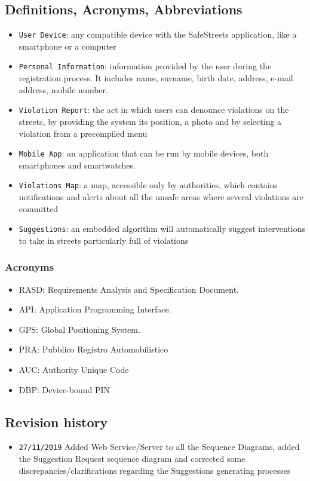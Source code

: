 \documentclass[12pt,a4paper]{article}
\begin{document}
\subsection{Definitions, Acronyms, Abbreviations}
			\begin{itemize}
				\item \texttt{User Device}: any compatible device with the SafeStreets application, like a smartphone or a computer
				\item \texttt{Personal Information}: information provided by the user during the registration process. It includes name, surname, birth date, address, e-mail address, mobile number.
				\item \texttt{Violation Report}: the act in which users can denounce violations on the streets, by providing the system its position, a photo and by selecting a violation from a precompiled menu
				\item \texttt{Mobile App}: an application that can be run by mobile devices, both smartphones and smartwatches.
				\item \texttt{Violations Map}: a map, accessible only by authorities, which contains notifications and alerts about all the unsafe areas where several violations are committed
				\item \texttt{Suggestions}: an embedded algorithm will automatically suggest interventions to take in streets particularly full of violations
			\end{itemize}
		\subsubsection{Acronyms}
			\begin{itemize}
				\item RASD: Requirements Analysis and Specification Document.
				\item API: Application Programming Interface.
				\item GPS: Global Positioning System.
				\item PRA: Pubblico Registro Automobilistico
				\item AUC: Authority Unique Code
				\item DBP: Device-bound PIN
			\end{itemize}
\subsection{Revision history}
\begin{itemize}
\item \texttt{27/11/2019} Added Web Service/Server to all the Sequence Diagrams, added the Suggestion Request sequence diagram and corrected some discrepancies/clarifications regarding the Suggestions generating processes
\end{itemize}
\newpage
\end{document}
